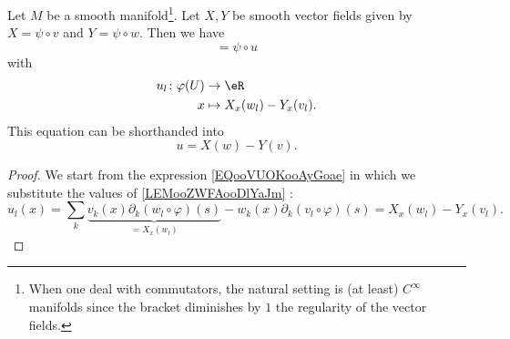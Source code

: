 \begin{lemma}
	Let \( M\) be a smooth manifold\footnote{When one deal with commutators, the natural setting is (at least) \(  C^{\infty}\) manifolds since the bracket diminishes by \( 1\) the regularity of the vector fields.}. Let \( X,Y\) be smooth vector fields given by \( X=\psi\circ v\) and \( Y=\psi\circ w\). Then we have
	\begin{equation}
		[\psi\circ v,\psi\circ w]=\psi\circ u
	\end{equation}
	with
	\begin{equation}
		\begin{aligned}
			u_l\colon \varphi(U) & \to \eR                    \\
			x                    & \mapsto X_x(w_l)-Y_x(v_l).
		\end{aligned}
	\end{equation}
	This equation can be shorthanded into
	\begin{equation}
		u=X(w)-Y(v).
	\end{equation}
\end{lemma}

\begin{proof}
	We start from the expression \ref{EQooVUOKooAyGoae} in which we substitute the values of \eqref{LEMooZWFAooDlYaJm} :
	\begin{equation}
		u_l(x)=\sum_k\underbrace{v_k(x)\partial_k(w_l\circ\varphi)(s)}_{=X_x(w_l)}-w_k(x)\partial_k(v_l\circ\varphi)(s)=X_x(w_l)-Y_x(v_l).
	\end{equation}
\end{proof}
